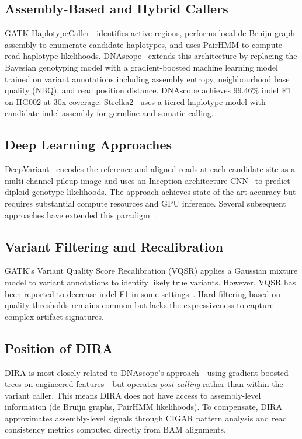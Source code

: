 \documentclass[sigconf]{acmart}
\begin{document}
\subsection{Assembly-Based and Hybrid Callers}
GATK HaplotypeCaller~\cite{poplin2018scaling} identifies active regions, performs local de Bruijn graph assembly to enumerate candidate haplotypes, and uses PairHMM to compute read-haplotype likelihoods. DNAscope~\cite{freed2022dnascope} extends this architecture by replacing the Bayesian genotyping model with a gradient-boosted machine learning model trained on variant annotations including assembly entropy, neighbourhood base quality (NBQ), and read position distance. DNAscope achieves 99.46\% indel F1 on HG002 at 30x coverage. Strelka2~\cite{kim2018strelka2} uses a tiered haplotype model with candidate indel assembly for germline and somatic calling.

\subsection{Deep Learning Approaches}
DeepVariant~\cite{poplin2018universal} encodes the reference and aligned reads at each candidate site as a multi-channel pileup image and uses an Inception-architecture CNN~\cite{szegedy2015rethinking} to predict diploid genotype likelihoods. The approach achieves state-of-the-art accuracy but requires substantial compute resources and GPU inference. Several subsequent approaches have extended this paradigm~\cite{luo2018clairvoyante}.

\subsection{Variant Filtering and Recalibration}
GATK's Variant Quality Score Recalibration (VQSR) applies a Gaussian mixture model to variant annotations to identify likely true variants. However, VQSR has been reported to decrease indel F1 in some settings~\cite{zhao2020accuracy}. Hard filtering based on quality thresholds remains common but lacks the expressiveness to capture complex artifact signatures.

\subsection{Position of DIRA}
DIRA is most closely related to DNAscope's approach---using gradient-boosted trees on engineered features---but operates \textit{post-calling} rather than within the variant caller. This means DIRA does not have access to assembly-level information (de Bruijn graphs, PairHMM likelihoods). To compensate, DIRA approximates assembly-level signals through CIGAR pattern analysis and read consistency metrics computed directly from BAM alignments.
\end{document}
